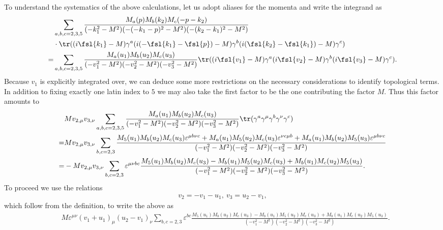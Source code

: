 To understand the systematics of the above calculations, let us adopt aliases for the momenta and write the integrand as
\begin{align*}
	 &\sum\limits_{a, b, c = 2, 3, 5}\frac{M_{a}(p)M_{b}(k_{2})M_{c}(-p - k_{2})}{(-k_{1}^{2} - M^{2})(-(-k_{1} - p)^{2} - M^{2})(-(k_{2} - k_{1})^{2} - M^{2})} \\
	 &\cdot\tr((i\fsl{k_{1}} - M)\gamma^{a}(i(-\fsl{k_{1}} - \fsl{p}) - M)\gamma^{b}(i(\fsl{k_{2}} - \fsl{k_{1}}) - M)\gamma^{c}) \\
	=& \sum\limits_{a, b, c = 2, 3, 5}\frac{M_{a}(u_{1})M_{b}(u_{2})M_{c}(u_{3})}{(-v_{1}^{2} - M^{2})(-v_{2}^{2} - M^{2})(-v_{3}^{2} - M^{2})}\tr((i\fsl{v_{1}} - M)\gamma^{a}(i\fsl{v_{2}} - M)\gamma^{b}(i\fsl{v_{3}} - M)\gamma^{c}).
\end{align*}
Because $v_{1}$ is explicitly integrated over, we can deduce some more restrictions on the necessary considerations to identify topological terms. In addition to fixing exactly one latin index to $5$ we may also take the first factor to be the one contributing the factor $M$. Thus this factor amounts to
\begin{align*}
	 &Mv_{2, \mu}v_{3, \nu}\sum\limits_{a, b, c = 2, 3, 5}\frac{M_{a}(u_{1})M_{b}(u_{2})M_{c}(u_{3})}{(-v_{1}^{2} - M^{2})(-v_{2}^{2} - M^{2})(-v_{3}^{2} - M^{2})}\tr(\gamma^{a}\gamma^{\mu}\gamma^{b}\gamma^{\nu}\gamma^{c}) \\
	=& Mv_{2, \mu}v_{3, \nu}\sum\limits_{b, c = 2, 3}\frac{M_{5}(u_{1})M_{b}(u_{2})M_{c}(u_{3})\varepsilon^{\mu b\nu c} + M_{a}(u_{1})M_{5}(u_{2})M_{c}(u_{3})\varepsilon^{\nu c\mu b} + M_{a}(u_{1})M_{b}(u_{2})M_{5}(u_{3})\varepsilon^{\mu b\nu c}}{(-v_{1}^{2} - M^{2})(-v_{2}^{2} - M^{2})(-v_{3}^{2} - M^{2})} \\
	=& -Mv_{2, \mu}v_{3, \nu}\sum\limits_{b, c = 2, 3}\varepsilon^{\mu\nu bc}\frac{M_{5}(u_{1})M_{b}(u_{2})M_{c}(u_{3}) - M_{b}(u_{1})M_{5}(u_{2})M_{c}(u_{3}) + M_{b}(u_{1})M_{c}(u_{2})M_{5}(u_{3})}{(-v_{1}^{2} - M^{2})(-v_{2}^{2} - M^{2})(-v_{3}^{2} - M^{2})}.
\end{align*}
To proceed we use the relations
\begin{align*}
	v_{2} = -v_{1} - u_{1},\ v_{3} = u_{2} - v_{1},
\end{align*}
which follow from the definition, to write the above as
\begin{align*}
	&M\varepsilon^{\mu\nu}(v_{1} + u_{1})_{\mu}(u_{2} - v_{1})_{\nu}\sum\limits_{b, c = 2, 3}\varepsilon^{bc}\frac{M_{5}(u_{1})M_{b}(u_{2})M_{c}(u_{3}) - M_{b}(u_{1})M_{5}(u_{2})M_{c}(u_{3}) + M_{b}(u_{1})M_{c}(u_{2})M_{5}(u_{3})}{(-v_{1}^{2} - M^{2})(-v_{2}^{2} - M^{2})(-v_{3}^{2} - M^{2})}.
\end{align*}
